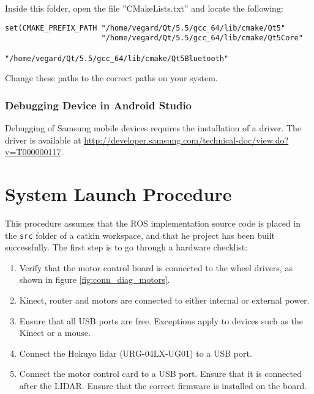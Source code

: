 Inside this folder, open the file ''CMakeLists.txt'' and locate the following:

\begin{verbatim}
set(CMAKE_PREFIX_PATH "/home/vegard/Qt/5.5/gcc_64/lib/cmake/Qt5"
					  "/home/vegard/Qt/5.5/gcc_64/lib/cmake/Qt5Core"
					  "/home/vegard/Qt/5.5/gcc_64/lib/cmake/Qt5Bluetooth"
\end{verbatim}

Change these paths to the correct paths on your system.

\subsubsection{Debugging Device in Android Studio}

Debugging of Samsung mobile devices requires the installation of a driver. The driver is available at \url{http://developer.samsung.com/technical-doc/view.do?v=T000000117}.




\section{System Launch Procedure}

This procedure assumes that the \ac{ROS} implementation source code is placed in the \texttt{src} folder of a catkin workspace, and that he project has been built successfully. The first step is to go through a hardware checklist:

\begin{enumerate}
	\item Verify that the motor control board is connected to the wheel drivers, as shown in figure \ref{fig:conn_diag_motors}.
	\item Kinect, router and motors are connected to either internal or external power.
	\item Ensure that all USB ports are free. Exceptions apply to devices such as the Kinect or a mouse. 
	\item Connect the Hokuyo lidar (URG-04LX-UG01) to a USB port.
	\item Connect the motor control card to a USB port. Ensure that it is connected after the LIDAR. Ensure that the correct firmware is installed on the board.
\end{enumerate}

